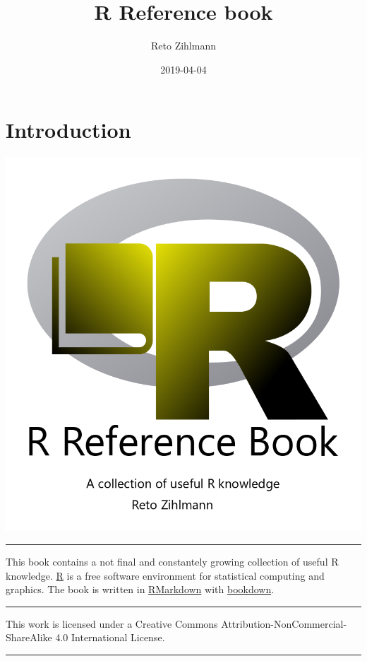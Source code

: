 \documentclass[]{book}
\title{R Reference book}
\author{Reto Zihlmann}
\date{2019-04-04}
\begin{document}
\maketitle

{
\setcounter{tocdepth}{1}
\tableofcontents
}
\chapter{Introduction}\label{introduction}

\begin{center}\includegraphics[width=0.7\linewidth]{figures/01_cover/Cover2} \end{center}

\begin{center}\rule{0.5\linewidth}{\linethickness}\end{center}

This book contains a not final and constantely growing collection of
useful R knowledge. \href{https://www.r-project.org/}{R} is a free
software environment for statistical computing and graphics. The book is
written in \href{https://rmarkdown.rstudio.com/}{RMarkdown} with
\href{https://bookdown.org/}{bookdown}.

\begin{center}\rule{0.5\linewidth}{\linethickness}\end{center}

This work is licensed under a Creative Commons
Attribution-NonCommercial-ShareAlike 4.0 International License.

\begin{center}\rule{0.5\linewidth}{\linethickness}\end{center}
\end{document}
